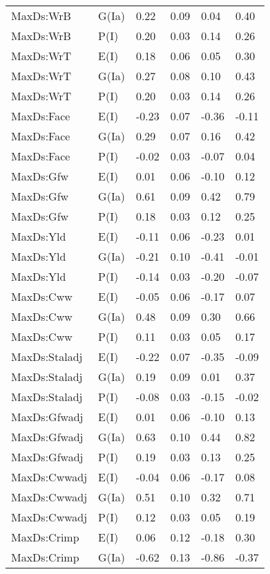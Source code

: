 \begin{center}
\begin{longtable}{|p{1.1in}|p{0.7in}|p{0.7in}|p{0.6in}|p{0.6in}|p{0.6in}|}
  MaxDs:WrB & G(Ia) & 0.22 & 0.09 & 0.04 & 0.40 \\ 
  MaxDs:WrB & P(I) & 0.20 & 0.03 & 0.14 & 0.26 \\ 
  MaxDs:WrT & E(I) & 0.18 & 0.06 & 0.05 & 0.30 \\ 
  MaxDs:WrT & G(Ia) & 0.27 & 0.08 & 0.10 & 0.43 \\ 
  MaxDs:WrT & P(I) & 0.20 & 0.03 & 0.14 & 0.26 \\ 
  MaxDs:Face & E(I) & -0.23 & 0.07 & -0.36 & -0.11 \\ 
  MaxDs:Face & G(Ia) & 0.29 & 0.07 & 0.16 & 0.42 \\ 
  MaxDs:Face & P(I) & -0.02 & 0.03 & -0.07 & 0.04 \\ 
  MaxDs:Gfw & E(I) & 0.01 & 0.06 & -0.10 & 0.12 \\ 
  MaxDs:Gfw & G(Ia) & 0.61 & 0.09 & 0.42 & 0.79 \\ 
  MaxDs:Gfw & P(I) & 0.18 & 0.03 & 0.12 & 0.25 \\ 
  MaxDs:Yld & E(I) & -0.11 & 0.06 & -0.23 & 0.01 \\ 
  MaxDs:Yld & G(Ia) & -0.21 & 0.10 & -0.41 & -0.01 \\ 
  MaxDs:Yld & P(I) & -0.14 & 0.03 & -0.20 & -0.07 \\ 
  MaxDs:Cww & E(I) & -0.05 & 0.06 & -0.17 & 0.07 \\ 
  MaxDs:Cww & G(Ia) & 0.48 & 0.09 & 0.30 & 0.66 \\ 
  MaxDs:Cww & P(I) & 0.11 & 0.03 & 0.05 & 0.17 \\ 
  MaxDs:Staladj & E(I) & -0.22 & 0.07 & -0.35 & -0.09 \\ 
  MaxDs:Staladj & G(Ia) & 0.19 & 0.09 & 0.01 & 0.37 \\ 
  MaxDs:Staladj & P(I) & -0.08 & 0.03 & -0.15 & -0.02 \\ 
  MaxDs:Gfwadj & E(I) & 0.01 & 0.06 & -0.10 & 0.13 \\ 
  MaxDs:Gfwadj & G(Ia) & 0.63 & 0.10 & 0.44 & 0.82 \\ 
  MaxDs:Gfwadj & P(I) & 0.19 & 0.03 & 0.13 & 0.25 \\ 
  MaxDs:Cwwadj & E(I) & -0.04 & 0.06 & -0.17 & 0.08 \\ 
  MaxDs:Cwwadj & G(Ia) & 0.51 & 0.10 & 0.32 & 0.71 \\ 
  MaxDs:Cwwadj & P(I) & 0.12 & 0.03 & 0.05 & 0.19 \\ 
  MaxDs:Crimp & E(I) & 0.06 & 0.12 & -0.18 & 0.30 \\ 
  MaxDs:Crimp & G(Ia) & -0.62 & 0.13 & -0.86 & -0.37 \\ 

\end{longtable}
\end{center}
